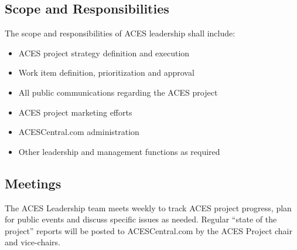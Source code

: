 \subsection{Scope and Responsibilities}
The scope and responsibilities of ACES leadership shall include:
\begin{itemize}
    \item ACES project strategy definition and execution
    \item Work item definition, prioritization and approval
    \item All public communications regarding the ACES project
    \item ACES project marketing efforts
    \item ACESCentral.com administration
    \item Other leadership and management functions as required
\end{itemize}

\subsection{Meetings}
The ACES Leadership team meets weekly to track ACES project progress, plan for public events and discuss specific issues as needed. Regular “state of the project” reports will be posted to ACESCentral.com by the ACES Project chair and vice-chairs.
